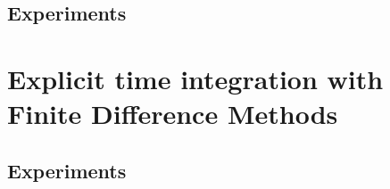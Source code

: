 \documentclass[sigconf]{acmart}
\begin{document}
\subsection{Experiments}




\section{Explicit time integration with Finite Difference Methods}
\subsection{Experiments}
\end{document}
